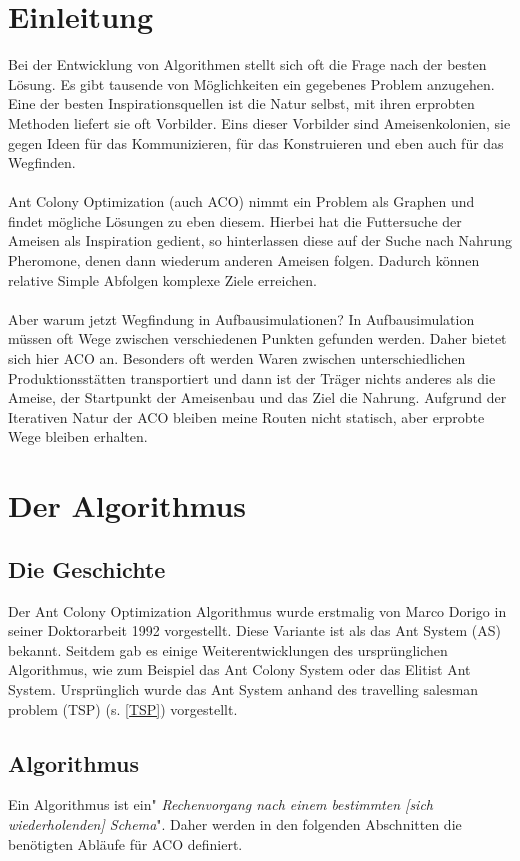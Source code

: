 \documentclass[12pt]{article}
\begin{document}
\thispagestyle{empty}
\tableofcontents
\pagebreak


\section{Einleitung} \label{Einleitung}
Bei der Entwicklung von Algorithmen stellt sich oft die Frage nach der besten Lösung. Es gibt tausende von Möglichkeiten ein gegebenes Problem anzugehen. Eine der besten Inspirationsquellen ist die Natur selbst, mit ihren erprobten Methoden liefert sie oft Vorbilder. Eins dieser Vorbilder sind Ameisenkolonien, sie gegen Ideen für das Kommunizieren, für das Konstruieren und eben auch für das Wegfinden.\\\\
Ant Colony Optimization (auch ACO) nimmt ein Problem als Graphen und findet mögliche Lösungen zu eben diesem. Hierbei hat die Futtersuche der Ameisen als Inspiration gedient, so hinterlassen diese auf der Suche nach Nahrung Pheromone, denen dann wiederum anderen Ameisen folgen. Dadurch können  relative Simple Abfolgen komplexe Ziele erreichen.\\\\
Aber warum jetzt Wegfindung in Aufbausimulationen? In Aufbausimulation müssen oft Wege zwischen verschiedenen Punkten gefunden werden. Daher bietet sich hier ACO an. Besonders oft werden Waren zwischen unterschiedlichen Produktionsstätten transportiert und dann ist der Träger nichts anderes als die Ameise, der Startpunkt der Ameisenbau und das Ziel die Nahrung. Aufgrund der Iterativen Natur der ACO bleiben meine Routen nicht statisch, aber erprobte Wege bleiben erhalten.
\section{Der Algorithmus}
\subsection{Die Geschichte}\label{Geschichte}
Der Ant Colony Optimization Algorithmus wurde erstmalig von Marco Dorigo in seiner Doktorarbeit 1992 vorgestellt. Diese Variante ist als das Ant System (AS) bekannt. Seitdem gab es einige Weiterentwicklungen des ursprünglichen Algorithmus, wie zum Beispiel das Ant Colony System oder das Elitist Ant System.
Ursprünglich wurde das Ant System anhand des travelling salesman problem (TSP) (s. \ref{TSP}) vorgestellt.
\subsection{Algorithmus}
Ein Algorithmus ist ein"\textit{ Rechenvorgang nach einem bestimmten [sich wiederholenden] Schema}"\cite{duden_algo}. Daher werden in den folgenden Abschnitten die benötigten Abläufe für ACO definiert.
\end{document}
